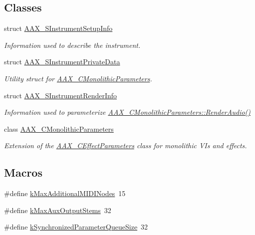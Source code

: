 \subsection*{Classes}
\begin{DoxyCompactItemize}
\item 
struct \hyperlink{a00124}{A\+A\+X\+\_\+\+S\+Instrument\+Setup\+Info}
\begin{DoxyCompactList}\small\item\em Information used to describe the instrument. \end{DoxyCompactList}\item 
struct \hyperlink{a00122}{A\+A\+X\+\_\+\+S\+Instrument\+Private\+Data}
\begin{DoxyCompactList}\small\item\em Utility struct for \hyperlink{a00026}{A\+A\+X\+\_\+\+C\+Monolithic\+Parameters}. \end{DoxyCompactList}\item 
struct \hyperlink{a00123}{A\+A\+X\+\_\+\+S\+Instrument\+Render\+Info}
\begin{DoxyCompactList}\small\item\em Information used to parameterize \hyperlink{a00026_a04f2f73d70ea28c17747c68fc3a20fc8}{A\+A\+X\+\_\+\+C\+Monolithic\+Parameters\+::\+Render\+Audio()} \end{DoxyCompactList}\item 
class \hyperlink{a00026}{A\+A\+X\+\_\+\+C\+Monolithic\+Parameters}
\begin{DoxyCompactList}\small\item\em Extension of the \hyperlink{a00018}{A\+A\+X\+\_\+\+C\+Effect\+Parameters} class for monolithic V\+Is and effects. \end{DoxyCompactList}\end{DoxyCompactItemize}
\subsection*{Macros}
\begin{DoxyCompactItemize}
\item 
\#define \hyperlink{a00178_af66ae5854aedf3b38c6d6540670966b1}{k\+Max\+Additional\+M\+I\+D\+I\+Nodes}~15
\item 
\#define \hyperlink{a00178_a3ce9db1fba97512379a8715f9cb166e4}{k\+Max\+Aux\+Output\+Stems}~32
\item 
\#define \hyperlink{a00178_a38d74fc5f1b026749c9b225353b4eb24}{k\+Synchronized\+Parameter\+Queue\+Size}~32
\end{DoxyCompactItemize}


